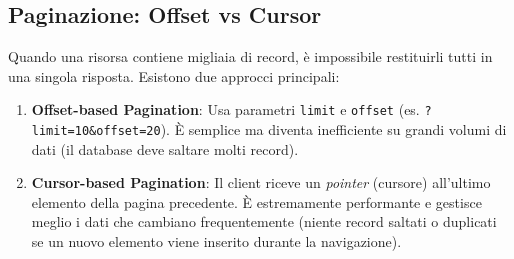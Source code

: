 \documentclass[11pt,a4paper]{report}
\begin{document}
\subsection{Paginazione: Offset vs Cursor}
Quando una risorsa contiene migliaia di record, è impossibile restituirli tutti in una singola risposta. Esistono due approcci principali:

\begin{enumerate}
    \item \textbf{Offset-based Pagination}: Usa parametri \texttt{limit} e \texttt{offset} (es. \texttt{?limit=10\&offset=20}). \`E semplice ma diventa inefficiente su grandi volumi di dati (il database deve saltare molti record).
    \item \textbf{Cursor-based Pagination}: Il client riceve un \textit{pointer} (cursore) all'ultimo elemento della pagina precedente. \`E estremamente performante e gestisce meglio i dati che cambiano frequentemente (niente record saltati o duplicati se un nuovo elemento viene inserito durante la navigazione).
\end{enumerate}
\end{document}
